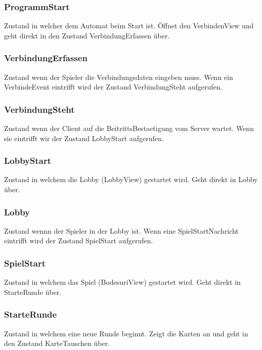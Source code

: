 \documentclass[12pt,halfparskip]{scrartcl}
\begin{document}
\subsubsection{ProgrammStart} %
\label{ssub:programmstart}
Zustand in welcher dem Automat beim Start ist. Öffnet den VerbindenView und geht direkt in den Zustand VerbindungErfassen über.

\subsubsection{VerbindungErfassen} %
\label{ssub:verbinungerfassen}
Zustand wenn der Spieler die Verbindungsdaten eingeben muss. Wenn ein VerbindeEvent eintrifft wird der Zustand VerbindungSteht aufgerufen.

\subsubsection{VerbindungSteht} %
\label{ssub:verbindungsteht}
Zustand wenn der Client auf die BeitrittsBestaetigung vom Server wartet. Wenn sie eintrifft wir der Zustand LobbyStart aufgerufen.

\subsubsection{LobbyStart} %
\label{ssub:lobbystart}
Zustand in welchem die Lobby (LobbyView) gestartet wird. Geht direkt in Lobby über.

\subsubsection{Lobby} %
\label{ssub:lobby}
Zustand wennn der Spieler in der Lobby ist. Wenn eine SpielStartNachricht eintrifft wird der Zustand SpielStart aufgerufen.

\subsubsection{SpielStart} %
\label{ssub:spielstart}
Zustand in welchem das Spiel (BodesuriView) gestartet wird. Geht direkt in StarteRunde über.

\subsubsection{StarteRunde} %
\label{ssub:starterunde}
Zustand in welchem eine neue Runde beginnt. Zeigt die Karten an und geht in den Zustand KarteTauschen über.
\end{document}
